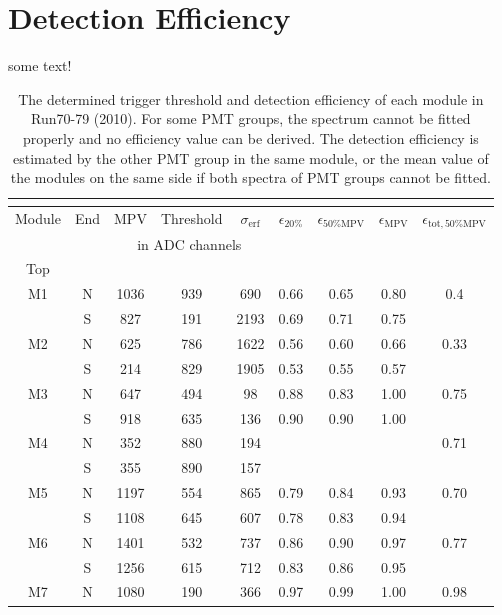 \section{Detection Efficiency}
\label{sec:appendix}
some text!
\small
\begin{longtable}{c c c c c c c c c}
  \caption{The determined trigger threshold and detection efficiency of each module in Run70-79 (2010). For some PMT groups, the spectrum cannot be fitted properly and no efficiency value can be derived. The detection efficiency is estimated by the other PMT group in the same module, or the mean value of the modules on the same side if both spectra of PMT groups cannot be fitted. } \\
  \label{tab:mpv-full}\\
  \toprule
  Module & End & MPV & Threshold & $\sigma{}_{\mathrm{erf}}$ & $\epsilon_{20\%}$ & $\epsilon_{50\%\mathrm{MPV}}$ & $\epsilon_{\mathrm{MPV}}$ & $\epsilon_{\mathrm{tot}, 50\%\mathrm{MPV}}$ \\
         &     & \multicolumn{3}{|c|}{in ADC channels} &   \\
  \midrule
  \endfirsthead
  Top\\
  \midrule
  M1 & N & 1036 & 939 & 690 & 0.66 & 0.65 & 0.80 & \multirow{2}{*}{0.4}\\
     & S & 827 & 191 & 2193 & 0.69 & 0.71 & 0.75 & \\
  M2 & N & 625 & 786 & 1622 & 0.56 & 0.60 & 0.66 & \multirow{2}{*}{0.33}\\
     & S & 214 & 829 & 1905 & 0.53 & 0.55 & 0.57 & \\
  M3 & N & 647 & 494 & 98 & 0.88 & 0.83 & 1.00   & \multirow{2}{*}{0.75}\\
     & S & 918 & 635 & 136 & 0.90 & 0.90 & 1.00  & \\
  M4 & N & 352 & 880 & 194 &   &   &             & \multirow{2}{*}{0.71}\\
     & S & 355 & 890 & 157 &   &   &             & \\
  M5 & N & 1197 & 554 & 865 & 0.79 & 0.84 & 0.93 & \multirow{2}{*}{0.70}\\
     & S & 1108 & 645 & 607 & 0.78 & 0.83 & 0.94 & \\
  M6 & N & 1401 & 532 & 737 & 0.86 & 0.90 & 0.97 & \multirow{2}{*}{0.77}\\
     & S & 1256 & 615 & 712 & 0.83 & 0.86 & 0.95 & \\
  M7 & N & 1080 & 190 & 366 & 0.97 & 0.99 & 1.00 & \multirow{2}{*}{0.98}\\

\end{longtable}
